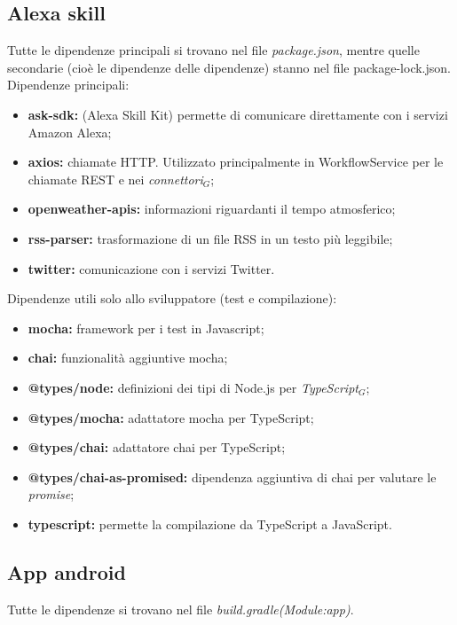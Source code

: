\subsection{Alexa skill}\label{ATecnologie}
Tutte le dipendenze principali si trovano nel file \textit{package.json}, mentre quelle secondarie (cioè le dipendenze delle dipendenze) stanno nel file package-lock.json.\\
Dipendenze principali:
\begin{itemize}
    \item \textbf{ask-sdk:} (Alexa Skill Kit) permette di comunicare direttamente con i servizi Amazon Alexa;
    \item \textbf{axios:} chiamate HTTP. Utilizzato principalmente in WorkflowService per le chiamate REST e nei \textit{connettori$_{G}$};
    \item \textbf{openweather-apis:} informazioni riguardanti il tempo atmosferico;
    \item \textbf{rss-parser:} trasformazione di un file RSS in un testo più leggibile;
    \item \textbf{twitter:} comunicazione con i servizi Twitter.
\end{itemize}
Dipendenze utili solo allo sviluppatore (test e compilazione):
\begin{itemize}
    \item \textbf{mocha:} framework per i test in Javascript;
    \item \textbf{chai:} funzionalità aggiuntive mocha;
    \item \textbf{@types/node:} definizioni dei tipi di Node.js per \textit{TypeScript$_{G}$};
    \item \textbf{@types/mocha:} adattatore mocha per TypeScript; 
    \item \textbf{@types/chai:} adattatore chai per TypeScript;
    \item \textbf{@types/chai-as-promised:} dipendenza aggiuntiva di chai per valutare le \textit{promise};
    \item \textbf{typescript:} permette la compilazione da TypeScript a JavaScript.
\end{itemize}

\subsection{App android}

Tutte le dipendenze si trovano nel file \textit{build.gradle(Module:app)}.\\

